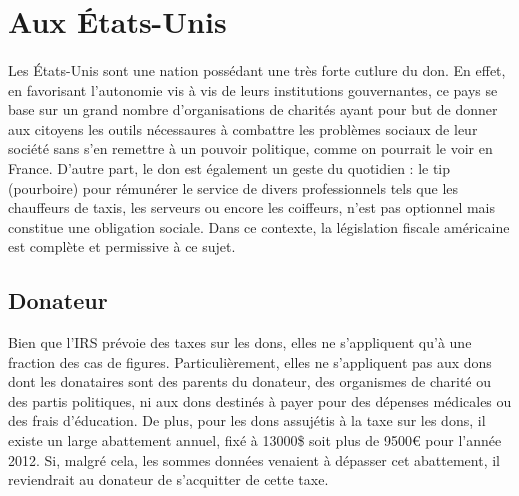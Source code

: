     \section{Aux États-Unis}
        \paragraph{}
            Les États-Unis sont une nation possédant une très forte cutlure
            du don. En effet, en favorisant l'autonomie vis à vis de leurs
            institutions gouvernantes, ce pays se base sur un grand nombre
            d'organisations de charités ayant pour but de donner aux citoyens
            les outils nécessaures à combattre les problèmes sociaux de leur
            société sans s'en remettre à un pouvoir politique, comme on
            pourrait le voir en France.
            D'autre part, le don est également un geste du quotidien :
            le tip (pourboire) pour rémunérer le service de divers
            professionnels tels que les chauffeurs de taxis, les serveurs ou
            encore les coiffeurs, n'est pas optionnel mais constitue une
            obligation sociale.
            Dans ce contexte, la législation fiscale américaine est
            complète et permissive à ce sujet.
        \subsection{Donateur}
            Bien que l'IRS prévoie des taxes sur les dons, elles ne
            s'appliquent qu'à une fraction des cas de figures.
            Particulièrement, elles ne s'appliquent pas aux dons dont les
            donataires sont des parents du donateur, des organismes de
            charité ou des partis politiques, ni aux dons destinés à payer
            pour des dépenses médicales ou des frais d'éducation.
            De plus, pour les dons assujétis à la taxe sur les dons, il
            existe un large abattement annuel, fixé à 13000\$ soit plus
            de 9500\euro{} pour l'année 2012. Si, malgré cela, les sommes
            données venaient à dépasser cet abattement, il reviendrait au
            donateur de s'acquitter de cette taxe.
